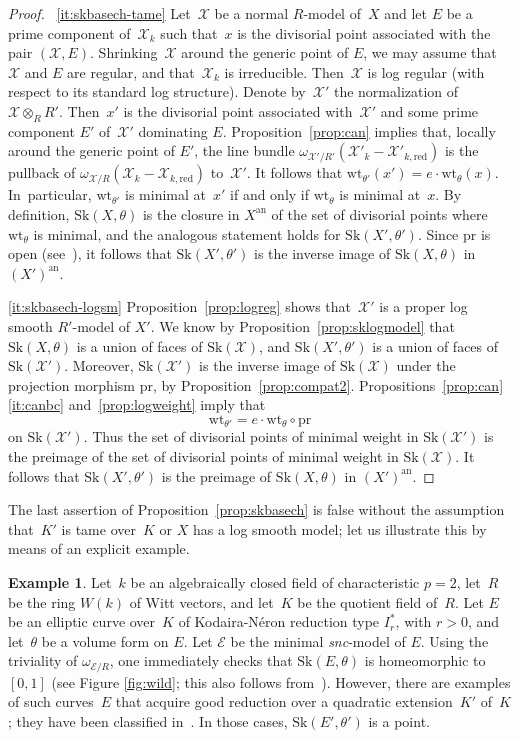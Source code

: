 \documentclass[JEP,XML,SOM,Unicode,NoFloatCountersInSection]{cedram}
\theoremstyle{definition}
\newtheorem{example}[equation]{Example}
\numberwithin{equation}{subsection}
\newcommand{\cX}{\ensuremath{\mathscr{X}}}
\newcommand{\cE}{\ensuremath{\mathscr{E}}}
\newcommand{\snc}{\textit{snc}}
\newcommand{\an}{\mathrm{an}}
\newcommand{\pr}{\mathrm{pr}}
\newcommand{\red}{\mathrm{red}}
\newcommand{\Sk}{\mathrm{Sk}}
\newcommand{\wt}{\mathrm{wt}}
\let\form\theta
\begin{document}
\skpt
\begin{proof}
~\eqref{it:skbasech-tame} Let~$\cX$ be a normal $R$\nobreakdash-model of~$X$ and let $E$ be a prime component of~$\cX_k$ such that~$x$ is the divisorial point associated with the pair $(\cX,E)$. Shrinking~$\cX$ around the generic point of $E$, we may assume that~$\cX$ and $E$ are regular, and that~$\cX_k$ is irreducible. Then~$\cX$ is log regular (with respect to its standard log structure).
Denote by~$\cX'$ the normalization of $\cX\otimes_R R'$. Then~$x'$ is the divisorial point associated with~$\cX'$ and some prime component $E'$ of~$\cX'$ dominating $E$.
Proposition~\ref{prop:can} implies that, locally around the generic point of $E'$, the line bundle $\omega_{\cX'/R'}(\cX'_k-\cX'_{k,\red})$ is the pullback of $\omega_{\cX/R}(\cX_k-\cX_{k,\red})$ to~$\cX'$. It follows that $\wt_{\form'}(x')=e\cdot \wt_{\form}(x)$. In~particular, $\wt_{\form'}$ is minimal at~$x'$ if and only if
$\wt_{\form}$ is minimal at~$x$.
By definition, $\Sk(X,\form)$ is the closure in $X^{\an}$ of the set of divisorial points where $\wt_{\form}$ is minimal, and the analogous statement holds for
$\Sk(X',\form')$. Since $\pr$ is open (see~\cite[3.2.7]{BerkIHES}),
it follows that $\Sk(X',\form')$ is the inverse image of $\Sk(X,\form)$ in $(X')^{\an}$.

\eqref{it:skbasech-logsm}
Proposition~\ref{prop:logreg} shows that~$\cX'$ is a proper log smooth $R'$-model of $X'$. We know by Proposition~\ref{prop:sklogmodel} that $\Sk(X,\form)$ is a union of faces of $\Sk(\cX)$, and
$\Sk(X',\form')$ is a union of faces of $\Sk(\cX')$.
Moreover, $\Sk(\cX')$ is the inverse image of $\Sk(\cX)$ under the projection morphism $\pr$, by Proposition~\ref{prop:compat2}.
Propositions~\ref{prop:can}\eqref{it:canbc} and~\ref{prop:logweight} imply that
\[
\wt_{\form'}=e\cdot \wt_{\form}\circ \pr
\]
on $\Sk(\cX')$.
Thus the set of divisorial points of minimal weight in $\Sk(\cX')$ is the preimage of the set of divisorial points of minimal weight in $\Sk(\cX)$.
It follows that $\Sk(X',\form')$ is the preimage of $\Sk(X,\form)$ in $(X')^{\an}$.
\end{proof}

The last assertion of Proposition~\ref{prop:skbasech} is false without the assumption that~$K'$ is tame over~$K$ or $X$ has a log smooth model; let us illustrate this by means of an explicit example.

\begin{example}\label{exam:wild}
Let~$k$ be an algebraically closed field of characteristic $p=2$, let~$R$ be the ring $W(k)$ of Witt vectors, and let~$K$ be the quotient field of~$R$.
Let $E$ be an elliptic curve over~$K$ of Kodaira-Néron reduction type $I_{r}^{\ast}$, with $r>0$, and let~$\form$ be a volume form on $E$.
Let $\cE$ be the minimal \snc-model of $E$. Using the triviality of $\omega_{\cE/R}$, one immediately checks that $\Sk(E,\form)$ is homeomorphic to $[0,1]$ (see Figure \ref{fig:wild}; this also follows from~\cite[3.3.13]{BaNi}).
However, there are examples of such curves~$E$ that acquire good reduction over a quadratic extension~$K'$ of~$K$; they have been classified in~\cite[2.8]{lor}. In those cases, $\Sk(E',\form')$ is a point.
\end{example}
\end{document}
